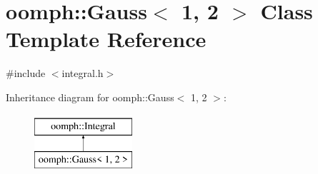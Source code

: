 \hypertarget{classoomph_1_1Gauss_3_011_00_012_01_4}{}\section{oomph\+:\+:Gauss$<$ 1, 2 $>$ Class Template Reference}
\label{classoomph_1_1Gauss_3_011_00_012_01_4}


{\ttfamily \#include $<$integral.\+h$>$}

Inheritance diagram for oomph\+:\+:Gauss$<$ 1, 2 $>$\+:\begin{figure}[H]
\begin{center}
\leavevmode
\includegraphics[height=2.000000cm]{classoomph_1_1Gauss_3_011_00_012_01_4}
\end{center}
\end{figure}
